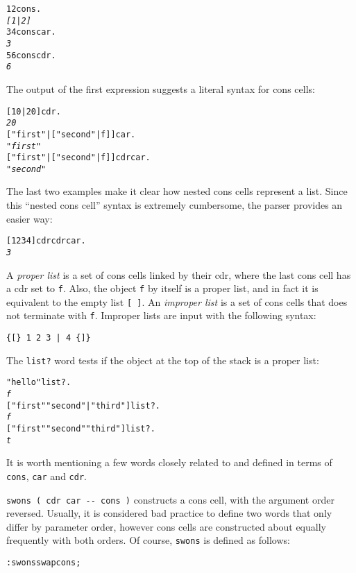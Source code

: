 \documentclass[english]{article}
\begin{document}
\begin{alltt}
1 2 cons .
\emph{{[} 1 | 2 {]}}
3 4 cons car .
\emph{3}
5 6 cons cdr .
\emph{6}
\end{alltt}
The output of the first expression suggests a literal syntax for cons
cells:

\begin{alltt}
{[} 10 | 20 {]} cdr .
\emph{20}
{[} "first" | {[} "second" | f {]} {]} car .
\emph{"first"}
{[} "first" | {[} "second" | f {]} {]} cdr car .
\emph{"second"}
\end{alltt}
The last two examples make it clear how nested cons cells represent
a list. Since this {}``nested cons cell'' syntax is extremely cumbersome,
the parser provides an easier way:

\begin{alltt}
{[} 1 2 3 4 {]} cdr cdr car .
\emph{3}
\end{alltt}
A \emph{proper list} is a set of cons cells linked by their cdr, where the last cons cell has a cdr set to \texttt{f}. Also, the object \texttt{f} by itself
is a proper list, and in fact it is equivalent to the empty list \texttt{{[}
{]}}. An \emph{improper list} is a set of cons cells that does not terminate with \texttt{f}. Improper lists are input with the following syntax:

\begin{verbatim}
{[} 1 2 3 | 4 {]}
\end{verbatim}

The \texttt{list?} word tests if the object at the top of the stack
is a proper list:

\begin{alltt}
"hello" list? .
\emph{f}
{[} "first" "second" | "third" {]} list? .
\emph{f}
{[} "first" "second" "third" {]} list? .
\emph{t}
\end{alltt}

It is worth mentioning a few words closely related to and defined in terms of \texttt{cons}, \texttt{car} and \texttt{cdr}.

\texttt{swons ( cdr car -{}- cons )} constructs a cons cell, with the argument order reversed. Usually, it is considered bad practice to define two words that only differ by parameter order, however cons cells are constructed about equally frequently with both orders. Of course, \texttt{swons} is defined as follows:

\begin{alltt}
: swons swap cons ;
\end{alltt}
\end{document}
